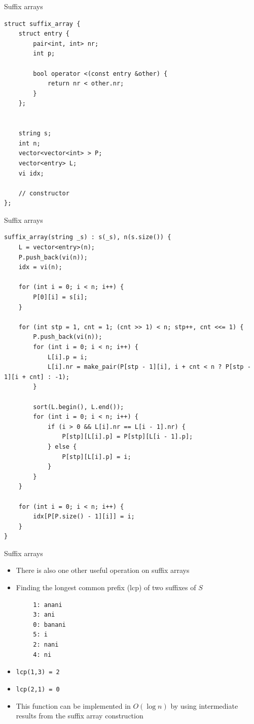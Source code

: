 \documentclass{beamer}
\begin{document}
\begin{frame}[fragile]{Suffix arrays}
	\begin{verbatim}
struct suffix_array {
	struct entry {
		pair<int, int> nr;
		int p;
		
		bool operator <(const entry &other) {
			return nr < other.nr;
		}
	};
	
	
	string s;
	int n;
	vector<vector<int> > P;
	vector<entry> L;
	vi idx;
	
	// constructor
};
	\end{verbatim}
\end{frame}

\begin{frame}[fragile]{Suffix arrays}
	\begin{verbatim}
suffix_array(string _s) : s(_s), n(s.size()) {
	L = vector<entry>(n);
	P.push_back(vi(n));
	idx = vi(n);
	
	for (int i = 0; i < n; i++) {
		P[0][i] = s[i];
	}
	
	for (int stp = 1, cnt = 1; (cnt >> 1) < n; stp++, cnt <<= 1) {
		P.push_back(vi(n));
		for (int i = 0; i < n; i++) {
			L[i].p = i;
			L[i].nr = make_pair(P[stp - 1][i], i + cnt < n ? P[stp - 1][i + cnt] : -1);
		}
		
		sort(L.begin(), L.end());
		for (int i = 0; i < n; i++) {
			if (i > 0 && L[i].nr == L[i - 1].nr) {
				P[stp][L[i].p] = P[stp][L[i - 1].p];
			} else {
				P[stp][L[i].p] = i;
			}
		}
	}
	
	for (int i = 0; i < n; i++) {
		idx[P[P.size() - 1][i]] = i;
	}
}
	\end{verbatim}
\end{frame}

\begin{frame}[fragile]{Suffix arrays}
	\begin{itemize}
		\item There is also one other useful operation on suffix arrays
		\item Finding the longest common prefix (lcp) of two suffixes of $S$
	\end{itemize}
	
	\begin{verbatim}
		1: anani
		3: ani
		0: banani
		5: i
		2: nani
		4: ni
	\end{verbatim}
	
	\begin{itemize}
		\item \texttt{lcp(1,3) = 2}
		\item \texttt{lcp(2,1) = 0}
		\vspace{10pt}
		\item This function can be implemented in $O(\log n)$ by using intermediate results from the suffix array construction
	\end{itemize}
\end{frame}
\end{document}
